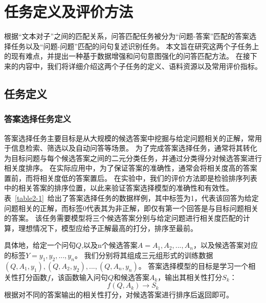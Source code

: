 \chapter{任务定义及评价方法}

根据“文本对子”之间的匹配关系，问答匹配任务被分为“问题-答案”匹配的答案选择任务以及“问题-问题”匹配的问句复述识别任务。
本文旨在研究这两个子任务上的现有难点，并提出一种基于数据增强和问句意图强化的问答匹配方法。
在接下来的内容中，我们将详细介绍这两个子任务的定义、语料资源以及常用评价指标。

\section{任务定义}

\subsection{答案选择任务定义}

答案选择任务主要目标是从大规模的候选答案中挖掘与给定问题相关的正解，常用于信息检索、筛选以及自动问答等场景。
为了完成答案选择任务，通常将其转化为目标问题与每个候选答案之间的二元分类任务，并通过分类得分对候选答案进行相关度排序。
在实际应用中，为了保证答案的准确性，通常会将相关度高的答案置前，而将相关度低的答案置后。
在实验中，我们的评价方法即是检验排序列表中的相关答案的排序位置，以此来验证答案选择模型的准确性和有效性。
表~\ref{table2-1}~给出了答案选择任务的数据样例，其中标签为1，代表该回答为给定问题相关的正解，而标签0代表其为非正解，即仅有第一个回答是与目标问题相关的答案。
该任务需要模型将三个候选答案分别与给定问题进行相关度匹配的计算，理想情况下，模型应给予正解最高的打分，排序至最前。

具体地，给定一个问句$Q$,以及n个候选答案$A={A_1, A_2,..., A_n}$，以及候选答案对应的标签$Y={y_1, y_2,..., y_n}$。
我们分别将其组成三元组形式的训练数据$(Q, A_1, y_1), (Q, A_2, y_2),..., (Q, A_n, y_n)$。
答案选择模型的目标是学习一个相关性打分函数$f$，该函数输入问句$Q$和候选答案$A_k$，输出其相关性打分$S_k$：
\begin{equation}
    f(Q, A_k) \rightarrow S_k
\end{equation}
根据对不同的答案输出的相关性打分，对候选答案进行排序后返回即可。

